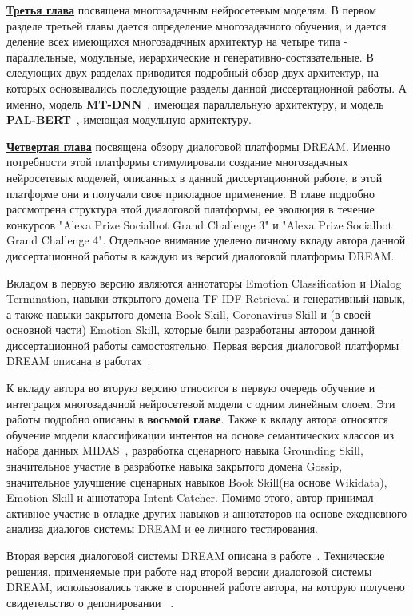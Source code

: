 \underline{\textbf{Третья глава}} посвящена многозадачным нейросетевым моделям. В первом разделе третьей главы дается определение многозадачного обучения, и дается деление всех имеющихся многозадачных архитектур на четыре типа - параллельные, модульные, иерархические и генеративно-состязательные. В следующих двух разделах приводится подробный обзор двух архитектур, на которых основывались последующие разделы данной диссертационной работы. А именно, модель \textbf{MT-DNN}~\cite{mtdnn}, имеющая параллельную архитектуру, и модель \textbf{PAL-BERT}~\cite{stickland_2019}, имеющая модульную архитектуру. 

\underline{\textbf{Четвертая глава}} посвящена обзору диалоговой платформы DREAM. Именно потребности этой платформы стимулировали создание многозадачных нейросетевых моделей, описанных в данной диссертационной работе, в этой платформе они и получали свое прикладное применение. В главе подробно рассмотрена структура этой диалоговой платформы, ее эволюция в течение конкурсов "Alexa Prize Socialbot Grand Challenge 3" и "Alexa Prize Socialbot Grand Challenge 4". Отдельное внимание уделено личному вкладу автора данной диссертационной работы в каждую из версий диалоговой платформы DREAM. 

Вкладом в первую версию являются аннотаторы Emotion Classification и Dialog Termination, навыки открытого домена TF-IDF Retrieval и генеративный навык, а также навыки закрытого домена Book Skill, Coronavirus Skill и (в своей основной части) Emotion Skill, которые были разработаны автором данной диссертационной работы самостоятельно. Первая версия диалоговой платформы DREAM описана в работах~\cite{dream1,dream1_trudy}.

К вкладу автора во вторую версию относится в первую очередь обучение и интеграция многозадачной нейросетевой модели с одним линейным слоем. Эти работы подробно описаны в \textbf{восьмой главе}.  Также к вкладу автора относятся обучение модели классификации интентов на основе семантических классов из набора данных MIDAS~\cite{midas}, разработка сценарного навыка Grounding Skill, значительное участие в разработке навыка закрытого домена Gossip, значительное улучшение сценарных навыков Book Skill(на основе Wikidata), Emotion Skill и аннотатора Intent Catcher. Помимо этого, автор принимал активное участие в отладке других навыков и аннотаторов на основе ежедневного анализа диалогов системы DREAM и ее личного тестирования. 

Вторая версия диалоговой системы DREAM описана в работе~\cite{dream2}. Технические решения, применяемые при работе над второй версии диалоговой системы DREAM, использовались также в сторонней работе автора, на которую получено свидетельство о депонировании ~\cite{Дуплякин_Дмитрий_Ондар_Ушаков_2021}. 


